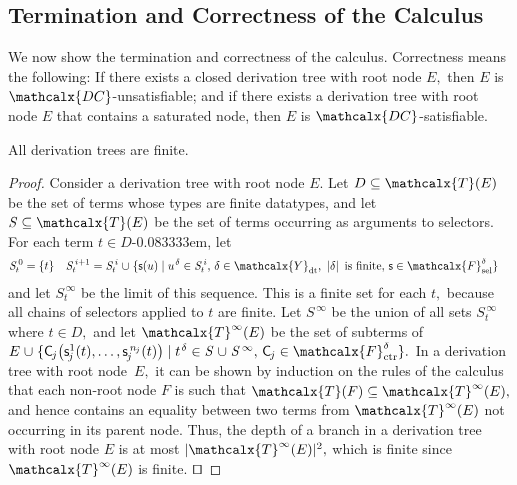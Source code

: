 \documentclass[smallcondensed,draft]{svjour3}
\newcommand\typ[1]{^{\vthinspace #1}}
\newcommand\afterDot{\;} %
\newcommand\const[1]{\textsf{#1}}
\newcommand\xqed{{\hfill$\scriptstyle\squareforqed$}}
\newcommand{\Ec}{E}
\newcommand{\Fc}{F}
\newcommand{\tEc}{\Terms(\Ec)}
\newcommand{\tcEc}{\Terms^\infty(\Ec)}
\newcommand\SSS{\mathit{S}}
\newcommand\SSSS[1]{\mathit{S}^{\,#1}}
\newcommand{\thD}{\mathcalx{DC}}
\newcommand\Terms{\mathcalx{T}}
\newcommand\Types{\mathcalx{Y}}
\newcommand\Funcs{\mathcalx{F}}
\newcommand\Data{\Types_{\mathrm{dt}}}
\newcommand\Ctr{\Funcs_{\smash{\mathrm{ctr}}}}
\newcommand\Sel{\Funcs_{\smash{\mathrm{sel}}}}
\newcommand\vthinspace{\kern+0.083333em}
\newcommand\negvthinspace{\kern-0.083333em}
\begin{document}
\subsection{Termination and Correctness of the Calculus}
\label{sec:termination-and-correctness}

We now show the termination and correctness of the calculus.
Correctness means the following:
If there exists a closed derivation tree with root node
$\Ec,$ then $\Ec$ is $\thD$-unsatisfiable; and if there exists
a derivation tree with root node $\Ec$ that contains a saturated node, then
$\Ec$ is $\thD$-satisfiable.

\begin{theorem}[Termination]%
\label{thm:t}%
\afterDot
All derivation trees are finite.
\end{theorem}
\begin{proof}
Consider a derivation tree with root node $\Ec.$ Let $D \subseteq \tEc$ be the
set of terms whose types are finite datatypes, and let $\SSS \subseteq \tEc$ be
the set of terms occurring as arguments to selectors. For each term $t \in
D$\negvthinspace, let
\begin{align*}
\smash{\SSSS 0_t} & = \{ t \}
& \smash{\SSSS {i+1}_t} & = \smash{\SSSS i_t \mathrel\cup \{ \const s( u ) \mid u\typ{\delta} \in \SSSS i_t{,}~ \delta \in \Data{,}~ \left|\delta\right| \text{ is finite}{,}~ \const{s} \in \Sel^{\delta}}  \}
\end{align*}
and let $\SSSS \infty_t$ be the limit of this sequence.
This is a finite set for each $t,$
because all chains of selectors applied to $t$ are finite.
Let $\SSSS \infty$ be the union of all sets $\SSSS \infty_t$ where $t \in D,$
and let $\tcEc$ be the set of subterms of
%
$\Ec \mathrel\cup \{ \smash{\const C_{\negvthinspace j}\bigl( \const s^1_{\negvthinspace j}( t ), \ldots, \const s^{\smash{\,n_{\negvthinspace j}}}_{\negvthinspace j}( t ) \bigr)} \mid \smash{t\typ{\delta} \in \SSS \mathrel\cup \SSSS \infty{,}~ \const C_{\negvthinspace j} \in \smash{\Ctr^\delta}} \}.$
%
In a derivation tree with root node~$\Ec,$
it can be shown by induction
on the rules of the calculus that each non-root node $\Fc$ is such that
$\Terms(\Fc) \subseteq \tcEc,$ and hence contains an equality between two terms from $\tcEc$ not occurring in its parent node.
Thus, the depth of a branch in a derivation tree with root node $\Ec$ is at most $\left| \smash{\tcEc}\vphantom{X} \right|{\!}^2,$
which is finite since $\tcEc$ is finite.
\xqed
\end{proof}
\end{document}
